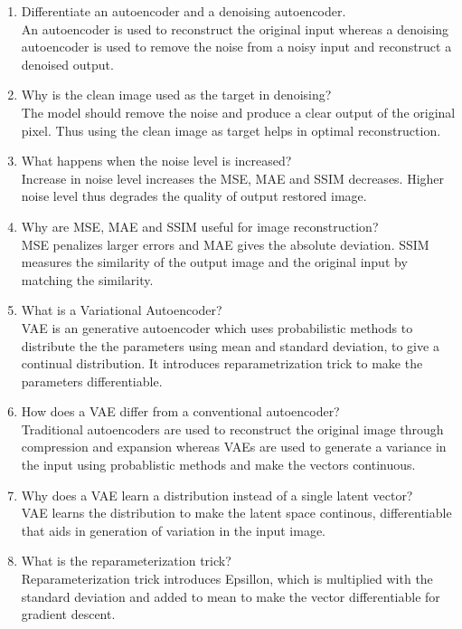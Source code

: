 \documentclass[10pt]{article}
\begin{document}
\begin{enumerate}
\item Differentiate an autoencoder and a denoising autoencoder.\\
\text An autoencoder is used to reconstruct the original input whereas a denoising autoencoder is used to remove the noise from a noisy input and reconstruct a denoised output.

\item Why is the clean image used as the target in denoising?\\
\text The model should remove the noise and produce a clear output of the original pixel. Thus using the clean image as target helps in optimal reconstruction.

\item What happens when the noise level is increased?\\
\text Increase in noise level increases the MSE, MAE and SSIM decreases. Higher noise level thus degrades the quality of output restored image.

\item Why are MSE, MAE and SSIM useful for image reconstruction?\\
\text MSE penalizes larger errors and MAE gives the absolute deviation. SSIM measures the similarity of the output image and the original input by matching the similarity.

\item What is a Variational Autoencoder?\\
\text VAE is an generative autoencoder which uses probabilistic methods to distribute the the parameters using mean and standard deviation, to give a continual distribution. It introduces reparametrization trick to make the parameters differentiable.

\item How does a VAE differ from a conventional autoencoder?\\
\text Traditional autoencoders are used to reconstruct the original image through compression and expansion whereas VAEs are used to generate a variance in the input using probablistic methods and make the vectors continuous.

\item Why does a VAE learn a distribution instead of a single latent vector?\\
\text VAE learns the distribution to make the latent space continous, differentiable that aids in generation of variation in the input image.

\item What is the reparameterization trick?\\
\text Reparameterization trick introduces Epsillon, which is multiplied with the standard deviation and added to mean to make the vector differentiable for gradient descent.


\end{enumerate}
\end{document}
